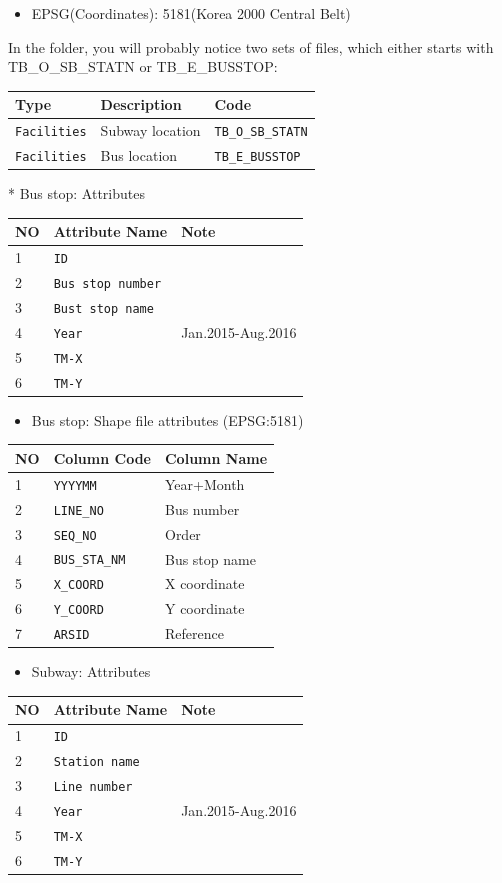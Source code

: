 \documentclass[]{book}
\providecommand{\tightlist}{%
  \setlength{\itemsep}{0pt}\setlength{\parskip}{0pt}}
\begin{document}
\begin{itemize}
\tightlist
\item
  EPSG(Coordinates): 5181(Korea 2000 Central Belt)
\end{itemize}

In the folder, you will probably notice two sets of files, which either
starts with TB\_O\_SB\_STATN or TB\_E\_BUSSTOP:

\begin{longtable}[]{@{}lll@{}}
\toprule
Type & Description & Code\tabularnewline
\midrule
\endhead
\texttt{Facilities} & Subway location &
\texttt{TB\_O\_SB\_STATN}\tabularnewline
\texttt{Facilities} & Bus location &
\texttt{TB\_E\_BUSSTOP}\tabularnewline
\bottomrule
\end{longtable}

 * Bus stop: Attributes

\begin{longtable}[]{@{}lll@{}}
\toprule
NO & Attribute Name & Note\tabularnewline
\midrule
\endhead
1 & \texttt{ID} &\tabularnewline
2 & \texttt{Bus\ stop\ number} &\tabularnewline
3 & \texttt{Bust\ stop\ name} &\tabularnewline
4 & \texttt{Year} & Jan.2015-Aug.2016\tabularnewline
5 & \texttt{TM-X} &\tabularnewline
6 & \texttt{TM-Y} &\tabularnewline
\bottomrule
\end{longtable}

\begin{itemize}
\tightlist
\item
  Bus stop: Shape file attributes (EPSG:5181)
\end{itemize}

\begin{longtable}[]{@{}lll@{}}
\toprule
NO & Column Code & Column Name\tabularnewline
\midrule
\endhead
1 & \texttt{YYYYMM} & Year+Month\tabularnewline
2 & \texttt{LINE\_NO} & Bus number\tabularnewline
3 & \texttt{SEQ\_NO} & Order\tabularnewline
4 & \texttt{BUS\_STA\_NM} & Bus stop name\tabularnewline
5 & \texttt{X\_COORD} & X coordinate\tabularnewline
6 & \texttt{Y\_COORD} & Y coordinate\tabularnewline
7 & \texttt{ARSID} & Reference\tabularnewline
\bottomrule
\end{longtable}

\begin{itemize}
\tightlist
\item
  Subway: Attributes
\end{itemize}

\begin{longtable}[]{@{}lll@{}}
\toprule
NO & Attribute Name & Note\tabularnewline
\midrule
\endhead
1 & \texttt{ID} &\tabularnewline
2 & \texttt{Station\ name} &\tabularnewline
3 & \texttt{Line\ number} &\tabularnewline
4 & \texttt{Year} & Jan.2015-Aug.2016\tabularnewline
5 & \texttt{TM-X} &\tabularnewline
6 & \texttt{TM-Y} &\tabularnewline
\bottomrule
\end{longtable}
\end{document}

